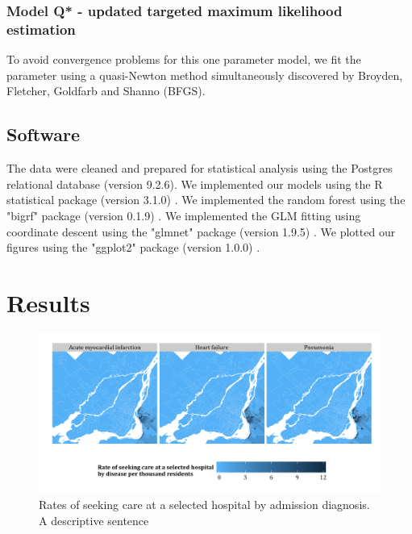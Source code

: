 \documentclass[]{article}\usepackage[]{graphicx}\usepackage[]{color}
\begin{document}
\subsubsection{Model Q* - updated targeted maximum likelihood estimation}

To avoid convergence problems for this one parameter model, we fit the parameter using a quasi-Newton method simultaneously discovered by Broyden\supercite{broyden_convergence_1970}, Fletcher\supercite{fletcher_new_1970}, Goldfarb\supercite{goldfarb_family_1970} and Shanno\supercite{shanno_conditioning_1970} (BFGS).


\subsection{Software}
The data were cleaned and prepared for statistical analysis using the Postgres relational database (version 9.2.6). We implemented our models using the R statistical package (version 3.1.0) \supercite{team_r:_2014}. We implemented the random forest using the "bigrf" package (version 0.1.9) \supercite{lim_bigrf:_2014}. We implemented the GLM fitting using coordinate descent using the "glmnet" package (version 1.9.5) \supercite{friedman_regularization_2010}. We plotted our figures using the "ggplot2" package (version 1.0.0) \supercite{wickham_ggplot2:_2009}.


\section{Results}
\begin{figure}[H]
    \includegraphics{../figures/hosp_choro.png}
    \caption[Rates of seeking care at a selected hospital by admission diagnosis.]
      {Rates of seeking care at a selected hospital by admission diagnosis. A descriptive sentence}
    \label{fig:hosp_choro}
\end{figure}
\end{document}
